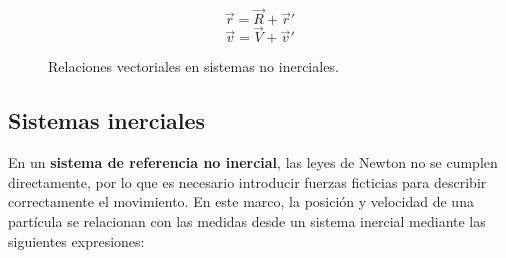 \documentclass[a4paper,12pt]{article}
\begin{document}
\begin{figure}[h]
\centering
\begin{minipage}{0.42\textwidth}
\centering
{}
\end{minipage}
\hspace{4cm} %
\begin{minipage}{0.28\textwidth}
\[
\vec{r} = \vec{R} + \vec{r}'
\]
\[
\vec{v} = \vec{V} + \vec{v}'
\]
\end{minipage}

\caption{Relaciones vectoriales en sistemas no inerciales.}
\end{figure}

\subsection{Sistemas inerciales}

En un \textbf{sistema de referencia no inercial}, las leyes de Newton no se cumplen directamente, por lo que es necesario introducir fuerzas ficticias para describir correctamente el movimiento.  
En este marco, la posición y velocidad de una partícula se relacionan con las medidas desde un sistema inercial mediante las siguientes expresiones:
\end{document}
